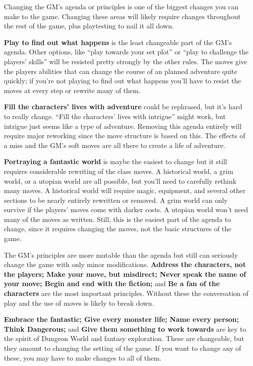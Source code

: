 Changing the GM's agenda or principles is one of the biggest changes you can make to the game. Changing these areas will likely require changes throughout the rest of the game, plus playtesting to nail it all down.


\textbf{Play to find out what happens}
is the least changeable part of the GM's agenda. Other options, like ``play towards your set plot'' or ``play to challenge the players' skills'' will be resisted pretty strongly by the other rules. The moves give the players abilities that can change the course of an planned adventure quite quickly; if you're not playing to find out what happens you'll have to resist the moves at every step or rewrite many of them.


\textbf{Fill the characters' lives with adventure}
could be rephrased, but it's hard to really change. ``Fill the characters' lives with intrigue'' might work, but intrigue just seems like a type of adventure. Removing this agenda entirely will require major reworking since the move structure is based on this. The effects of a miss and the GM's soft moves are all there to create a life of adventure.


\textbf{Portraying a fantastic world}
is maybe the easiest to change but it still requires considerable rewriting of the class moves. A historical world, a grim world, or a utopian world are all possible, but you'll need to carefully rethink many moves. A historical world will require magic, equipment, and several other sections to be nearly entirely rewritten or removed. A grim world can only survive if the players' moves come with darker costs. A utopian world won't need many of the moves as written. Still, this is the easiest part of the agenda to change, since it requires changing the moves, not the basic structures of the game.


The GM's principles are more mutable than the agenda but still can seriously change the game with only minor modifications. \textbf{Address the characters, not the players; Make your move, but misdirect; Never speak the name of your move; Begin and end with the fiction;}
and \textbf{Be a fan of the characters}
are the most important principles. Without these the conversation of play and the use of moves is likely to break down.


\textbf{Embrace the fantastic; Give every monster life; Name every person; Think Dangerous;}
and \textbf{Give them something to work towards}
are key to the spirit of Dungeon World and fantasy exploration. These are changeable, but they amount to changing the setting of the game. If you want to change any of these, you may have to make changes to all of them.


